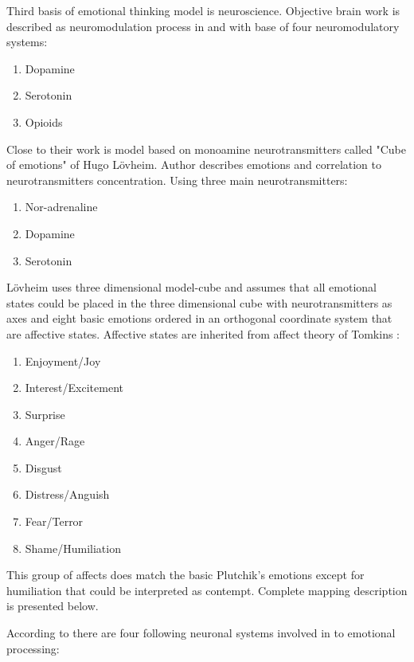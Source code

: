 Third basis of emotional thinking model is neuroscience. Objective brain work is described as neuromodulation process in \cite{neuromodulatory} and \cite{emotionsbraintorobot} with base of four neuromodulatory systems:

\begin{enumerate}
\item  Dopamine
\item  Serotonin
\item  Opioids
\end{enumerate}

Close to their work is model based on monoamine neurotransmitters called "Cube of emotions" of Hugo Lövheim\cite{cubeofemotions}.
Author describes emotions and correlation to neurotransmitters concentration. Using three main neurotransmitters:

\begin{enumerate}
\item  Nor-adrenaline
\item  Dopamine
\item  Serotonin
\end{enumerate}

Lövheim uses three dimensional model-cube and assumes that all emotional states could be placed in the three dimensional cube with neurotransmitters as axes and eight basic emotions ordered in an orthogonal coordinate system that are affective states. Affective states are inherited from affect theory of Tomkins \cite{tomkins1, tomkins2, tomkins3}:

\begin{enumerate}
\item  Enjoyment/Joy
\item  Interest/Excitement
\item  Surprise
\item  Anger/Rage
\item  Disgust
\item  Distress/Anguish
\item  Fear/Terror
\item  Shame/Humiliation
\end{enumerate}

This group of affects does match the basic Plutchik's emotions except for humiliation that could be interpreted as contempt. Complete mapping description is presented below.

According to \cite{emotionsbraintorobot} there are four following neuronal systems involved in to emotional processing:

